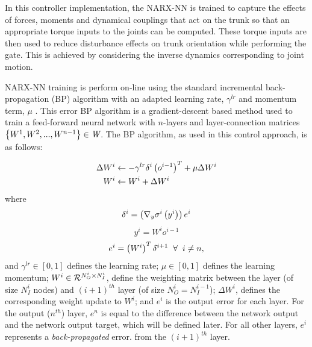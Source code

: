 		In this controller implementation, the NARX-NN is trained to capture the effects of forces, moments and dynamical couplings that act on the trunk so that an appropriate torque inputs to the joints can be computed. These torque inputs are then used to reduce disturbance effects on trunk orientation while performing the gate. This is achieved by considering the inverse dynamics corresponding to joint motion.

		NARX-NN training is perform on-line using the standard incremental back-propagation (BP) algorithm with an adapted learning rate, $\gamma^{lr}$ and momentum term, $\mu$ \cite{Rumelhart1988,Rumelhart1995}. This error BP algorithm \cite{Rojas1996ch7} is a gradient-descent based method used to train a feed-forward neural network with $n$-layers and layer-connection matrices $\left\{W^{1},W^{2},...,W^{n-1}\right\} \in \emph{W}$. The BP algorithm, as used in this control approach, is as follows: 

			\begin{equation}
				\begin{split}
					\Delta W^{i} &\leftarrow -\gamma^{lr} \delta^{i} \left(o^{i-1}\right)^{T}  + \mu \Delta W^{i} \\
					W^{i} &\leftarrow W^{i} + \Delta W^{i}
				\end{split}
				\label{eq::bp_weight_update}
			\end{equation} 
		where
			\begin{equation*}
				\delta^{i} = \left( \nabla_{y} \sigma^{i}\left(y^{i}\right) \right) e^{i}
				\label{eq::bp_error}
			\end{equation*}
			\begin{equation*}
				y^{i} = W^{i} o^{i-1}
				\label{eq::bp_error}
			\end{equation*}
			\begin{equation*}
				e^{i} =  \left( W^{i} \right)^{T} \delta^{i+1} \hspace{2mm} \forall \hspace{2mm} i\neq n,
			\end{equation*}
		and $\gamma^{lr} \in [0,1]$ defines the learning rate;  $\mu \in [0,1]$ defines the learning momentum; $W^{i} \in {\cal R}^{N_{O}^{i}\times N_{I}^{i}}$, define the weighting matrix between the \Ith layer (of size $N_{I}^{i}$ nodes) and $(i+1)^{th}$ layer (of size $N_{O}^{i}=N_{I}^{i-1}$); $\Delta W^{i}$, defines the corresponding weight update to $W^{i}$; and $e^{i}$ is the output error for each \Ith layer. For the output ($n^{th}$) layer, $e^{n}$ is equal to the difference between the network output and the network output target, which will be defined later. For all other layers, $e^{i}$ represents a \emph{back-propagated} error. from the $(i+1)^{th}$ layer.


